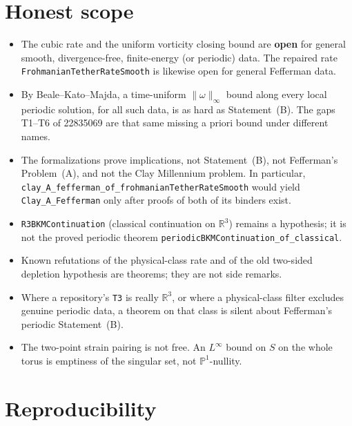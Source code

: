 \documentclass[11pt]{article}
\theoremstyle{plain}
\theoremstyle{definition}
\theoremstyle{remark}
\newcommand{\R}{\mathbb{R}}
\begin{document}
\section{Honest scope}

{\sloppy\begin{itemize}[leftmargin=1.4em]
\item The cubic rate and the uniform vorticity closing bound are \textbf{open} for general smooth, divergence-free, finite-energy (or periodic) data. The repaired rate \texttt{FrohmanianTether\allowbreak RateSmooth} is likewise open for general Fefferman data.
\item By Beale--Kato--Majda, a time-uniform \(\|\omega\|_{\infty}\) bound along every local periodic solution, for all such data, is as hard as Statement~(B). The gaps T1--T6 of 22835069 are that same missing a priori bound under different names.
\item The formalizations prove implications, not Statement~(B), not Fefferman's Problem~(A), and not the Clay Millennium problem. In particular, \texttt{clay\_\hspace{0pt}A\_\hspace{0pt}fefferman\_\hspace{0pt}of\_\hspace{0pt}frohmanianTether\allowbreak RateSmooth} would yield \texttt{Clay\_\hspace{0pt}A\_\hspace{0pt}Fefferman} only after proofs of both of its binders exist.
\item \texttt{R3BKMContinuation} (classical continuation on \(\R^{3}\)) remains a hypothesis; it is not the proved periodic theorem \texttt{periodicBKMContinuation\_\hspace{0pt}of\_\hspace{0pt}classical}.
\item Known refutations of the physical-class rate and of the old two-sided depletion hypothesis are theorems; they are not side remarks.
\item Where a repository's \texttt{T3} is really \(\R^{3}\), or where a physical-class filter excludes genuine periodic data, a theorem on that class is silent about Fefferman's periodic Statement~(B).
\item The two-point strain pairing is not free. An \(L^{\infty}\) bound on \(S\) on the whole torus is emptiness of the singular set, not \(\mathbb{P}^{1}\)-nullity.
\end{itemize}}

\section{Reproducibility}
\end{document}
